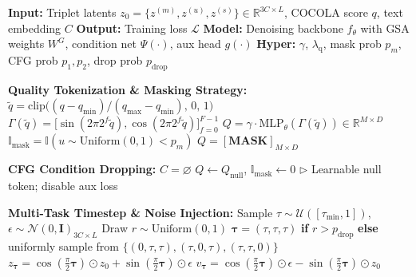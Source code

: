 \documentclass[lettersize,journal]{IEEEtran}
\begin{document}
\begin{algorithm}[t]
\caption{Quality-Aware Multi-Task DiT Joint Training}
\label{alg:quality_dit_training_fixed}
\begin{algorithmic}[1]
\STATE \textbf{Input:} Triplet latents $z_0 = \{z^{(m)}, z^{(u)}, z^{(s)}\} \in \mathbb{R}^{3C \times L}$, COCOLA score $q$, text embedding $C$
\STATE \textbf{Output:} Training loss $\mathcal{L}$
\STATE \textbf{Model:} Denoising backbone $f_\theta$ with GSA weights $W^G$, condition net $\Psi(\cdot)$, aux head $g(\cdot)$
\STATE \textbf{Hyper:} $\gamma$, $\lambda_{\mathrm{q}}$, mask prob $p_m$, CFG prob $p_1, p_2$, drop prob $p_{\mathrm{drop}}$

\item[] \textbf{Quality Tokenization \& Masking Strategy:}
\STATE $\tilde{q} = \mathrm{clip}\big( (q - q_{\min}) / (q_{\max} - q_{\min}), \, 0, \, 1 \big)$
\STATE $\Gamma(\tilde{q}) = \big[ \sin(2\pi 2^f \tilde{q}), \cos(2\pi 2^f \tilde{q}) \big]_{f=0}^{F-1}$
\STATE $Q = \gamma \cdot \mathrm{MLP}_{\theta}(\Gamma(\tilde{q})) \in \mathbb{R}^{M \times D}$
\STATE $\mathbb{I}_{\mathrm{mask}} = \mathbb{I}(u \sim \text{Uniform}(0, 1) < p_m)$
    \STATE $Q = [\mathbf{MASK}]_{M \times D}$
\ENDIF

\item[] \textbf{CFG Condition Dropping:}
    \STATE $C = \varnothing$ 
\ENDIF
{} 
    \STATE $Q \leftarrow Q_{\mathrm{null}}$, \quad $\mathbb{I}_{\mathrm{mask}} \leftarrow 0$ \hfill $\triangleright$ Learnable null token; disable aux loss
\ENDIF

\item[] \textbf{Multi-Task Timestep \& Noise Injection:}
\STATE Sample $\tau \sim \mathcal{U}([\tau_{\min},1])$, \quad $\epsilon \sim \mathcal{N}(0, \mathbf{I})_{3C \times L}$
\STATE Draw $r \sim \text{Uniform}(0, 1)$
\STATE $\boldsymbol{\tau} = (\tau, \tau, \tau)$ \textbf{if} $r > p_{\mathrm{drop}}$ \textbf{else} uniformly sample from $\{(0,\tau,\tau), (\tau,0,\tau), (\tau,\tau,0)\}$
\STATE $z_{\boldsymbol{\tau}} = \cos(\frac{\pi}{2}\boldsymbol{\tau}) \odot z_0 + \sin(\frac{\pi}{2}\boldsymbol{\tau}) \odot \epsilon$
\STATE $v_{\boldsymbol{\tau}} = \cos(\frac{\pi}{2}\boldsymbol{\tau}) \odot \epsilon - \sin(\frac{\pi}{2}\boldsymbol{\tau}) \odot z_0$


\end{algorithmic}
\end{algorithm}
\end{document}
